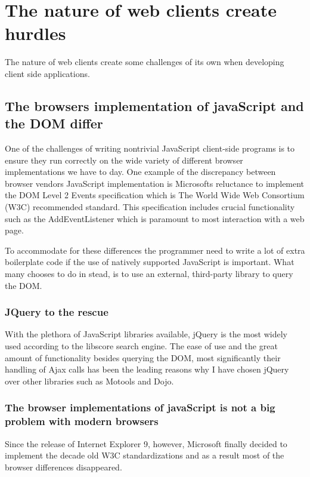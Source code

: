 \documentclass[english]{ifimaster}
\begin{document}
\section{The nature of web clients create hurdles}
The nature of web clients create some challenges of its own when developing client side applications. 

\subsection{The browsers implementation of javaScript and the DOM differ}
One of the challenges of writing nontrivial JavaScript client-side programs is to ensure they run correctly on the wide variety of different browser implementations we have to day\parencite[p. 325]{flanagan}. One example of the discrepancy between browser vendors JavaScript implementation is Microsofts reluctance to implement the DOM Level 2 Events specification which is The World Wide Web Consortium (W3C) recommended standard\parencite{w3c}. This specification includes crucial functionality such as the AddEventListener which is paramount to most interaction with a web page. 

To accommodate for these differences the programmer need to write a lot of extra boilerplate code if the use of natively supported JavaScript is important. What many chooses to do in stead, is to use an external, third-party library to query the DOM. 

\subsubsection{JQuery to the rescue}
With the plethora of JavaScript libraries available, jQuery is the most widely used according to the libscore search engine\parencite{infoWorld}. The ease of use and the great amount of functionality besides querying the DOM, most significantly their handling of Ajax calls has been the leading reasons why I have chosen jQuery over other libraries such as Motools and Dojo. 

\subsubsection{The browser implementations of javaScript is not a big problem with modern browsers}
Since the release of Internet Explorer 9, however, Microsoft finally decided to implement the decade old W3C standardizations and as a result most of the browser differences disappeared. 
\end{document}
